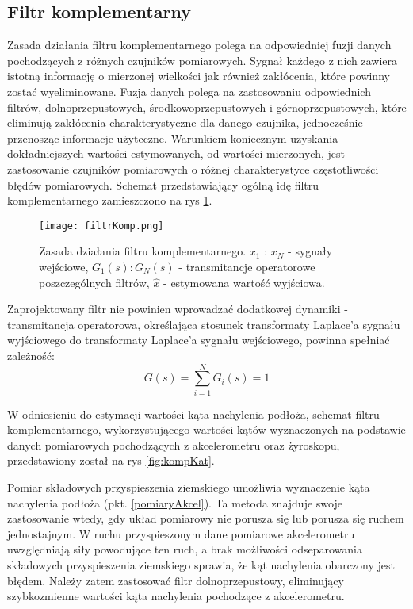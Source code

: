 \subsection{Filtr komplementarny}
\label{kompZasadaDzialania}
Zasada działania filtru komplementarnego polega na odpowiedniej fuzji danych pochodzących z różnych czujników pomiarowych. Sygnał każdego z nich zawiera istotną informację o mierzonej wielkości jak również zakłócenia, które powinny zostać wyeliminowane. Fuzja danych polega na zastosowaniu odpowiednich filtrów, dolnoprzepustowych, środkowoprzepustowych i górnoprzepustowych, które eliminują zakłócenia charakterystyczne dla danego czujnika, jednocześnie przenosząc informacje użyteczne. Warunkiem koniecznym uzyskania dokładniejszych wartości estymowanych, od wartości mierzonych, jest zastosowanie czujników pomiarowych o różnej charakterystyce częstotliwości błędów pomiarowych. Schemat przedstawiający ogólną idę filtru komplementarnego zamieszczono na rys \ref{fig:kompGeneral}.
\begin{figure}[h]
    \centering
    \texttt{[image: filtrKomp.png]}
    \caption{Zasada działania filtru komplementarnego. $x_1$ : $x_N$ - sygnały wejściowe, $G_1(s) : G_N(s)$ - transmitancje operatorowe poszczególnych filtrów, $\hat{x}$ - estymowana wartość wyjściowa.}
    \label{fig:kompGeneral}
\end{figure}

Zaprojektowany filtr nie powinien wprowadzać dodatkowej dynamiki - transmitancja operatorowa, określająca stosunek transformaty Laplace'a sygnału wyjściowego do transformaty Laplace'a sygnału wejściowego, powinna spełniać zależność:
\begin{equation}
    G(s)=\sum_{i=1}^{N}G_{i}(s)=1
    \label{eq:zasadaKomplementarnosci}
\end{equation}

W odniesieniu do estymacji wartości kąta nachylenia podłoża, schemat filtru komplementarnego, wykorzystującego wartości kątów wyznaczonych na podstawie danych pomiarowych pochodzących z akcelerometru oraz żyroskopu, przedstawiony został na rys \ref{fig:kompKat}. 

Pomiar składowych przyspieszenia ziemskiego umożliwia wyznaczenie kąta nachylenia podłoża (pkt. \ref{pomiaryAkcel}). Ta metoda znajduje swoje zastosowanie wtedy, gdy układ pomiarowy nie porusza się lub porusza się ruchem jednostajnym. W ruchu przyspieszonym dane pomiarowe akcelerometru uwzględniają siły powodujące ten ruch, a brak możliwości odseparowania składowych przyspieszenia ziemskiego sprawia, że kąt nachylenia obarczony jest błędem. Należy zatem zastosować filtr dolnoprzepustowy, eliminujący szybkozmienne wartości kąta nachylenia pochodzące z akcelerometru.

